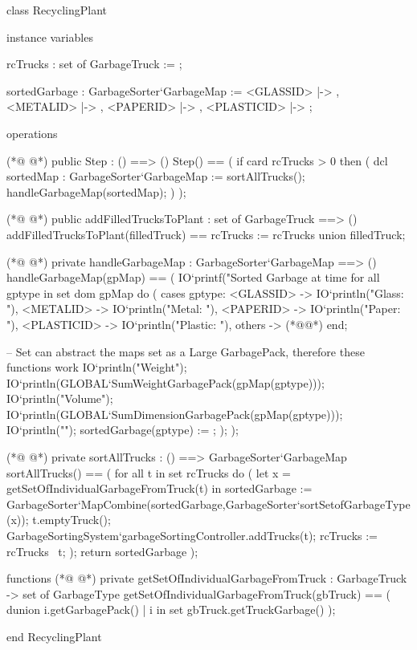 \begin{vdmpp}[breaklines=true]
class RecyclingPlant

instance variables

rcTrucks : set of GarbageTruck := {};

sortedGarbage : GarbageSorter`GarbageMap := {   <GLASSID>   |-> {},
                                                <METALID>   |-> {},
                                                <PAPERID>   |-> {},
                                                <PLASTICID> |-> {}
                                            };


operations

(*@
\label{Step:16}
@*)
public Step : () ==> ()
Step() == (
    if card rcTrucks > 0 then
    (
        dcl sortedMap : GarbageSorter`GarbageMap := sortAllTrucks();
            handleGarbageMap(sortedMap);
    )
);

(*@
\label{addFilledTrucksToPlant:25}
@*)
public addFilledTrucksToPlant : set of GarbageTruck ==> ()
addFilledTrucksToPlant(filledTruck) == 
    rcTrucks := rcTrucks union filledTruck;

(*@
\label{handleGarbageMap:29}
@*)
private handleGarbageMap : GarbageSorter`GarbageMap ==> ()
handleGarbageMap(gpMap) ==
(
    IO`printf("Sorted Garbage at time %
    for all gptype in set dom gpMap do
    (
        cases gptype:
            <GLASSID> -> IO`println("Glass: "),
            <METALID> -> IO`println("Metal: "),
            <PAPERID> -> IO`println("Paper: "),
            <PLASTICID> -> IO`println("Plastic: "),
            others -> (*@@*)
        end;

        -- Set can abstract the maps set as a Large GarbagePack, therefore these functions work
        IO`println("Weight");
        IO`println(GLOBAL`SumWeightGarbagePack(gpMap(gptype)));
        IO`println("Volume");
        IO`println(GLOBAL`SumDimensionGarbagePack(gpMap(gptype)));
        IO`println("");
        sortedGarbage(gptype) := {};
    );
);

(*@
\label{sortAllTrucks:53}
@*)
private sortAllTrucks : () ==> GarbageSorter`GarbageMap
sortAllTrucks() == (
    for all t in set rcTrucks
        do 
        (
            let x = getSetOfIndividualGarbageFromTruck(t) in
                sortedGarbage := GarbageSorter`MapCombine(sortedGarbage,GarbageSorter`sortSetofGarbageType(x));
            t.emptyTruck();
            GarbageSortingSystem`garbageSortingController.addTrucks({t});
            rcTrucks := rcTrucks \ {t};
        );
    return sortedGarbage 
);


functions
(*@
\label{getSetOfIndividualGarbageFromTruck:69}
@*)
private getSetOfIndividualGarbageFromTruck : GarbageTruck -> set of GarbageType
getSetOfIndividualGarbageFromTruck(gbTruck) == (
    dunion {i.getGarbagePack() | i in set gbTruck.getTruckGarbage()}
);


end RecyclingPlant
\end{vdmpp}

